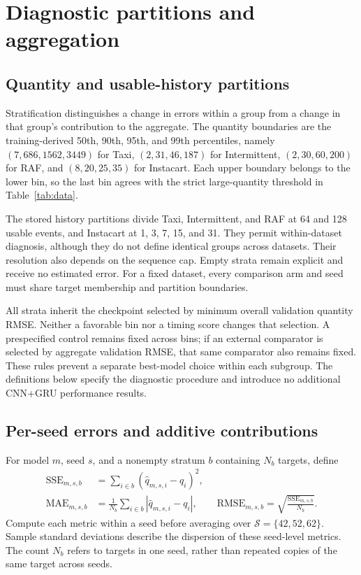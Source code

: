 \section{Diagnostic partitions and aggregation}
\label{app:strata}
\subsection{Quantity and usable-history partitions}
Stratification distinguishes a change in errors within a group from a change
in that group's contribution to the aggregate. The quantity boundaries are
the training-derived 50th, 90th, 95th, and 99th percentiles, namely
$(7,686,1562,3449)$ for Taxi, $(2,31,46,187)$ for Intermittent,
$(2,30,60,200)$ for RAF, and $(8,20,25,35)$ for Instacart.
Each upper boundary belongs to the lower bin, so the last bin agrees with
the strict large-quantity threshold in Table~\ref{tab:data}.

The stored history partitions divide Taxi, Intermittent, and RAF at 64 and
128 usable events, and Instacart at 1, 3, 7, 15, and 31. They permit
within-dataset diagnosis, although they do not define identical groups
across datasets. Their resolution also depends on the sequence cap.
Empty strata remain explicit and receive no estimated error. For a fixed
dataset, every comparison arm and seed must share target membership and
partition boundaries.

All strata inherit the checkpoint selected by minimum overall validation
quantity RMSE. Neither a favorable bin nor a timing score changes that
selection. A prespecified control remains fixed across bins; if an external
comparator is selected by aggregate validation RMSE, that same comparator
also remains fixed. These rules prevent a separate best-model choice within
each subgroup. The definitions below specify the diagnostic procedure and
introduce no additional CNN+GRU performance results.

\subsection{Per-seed errors and additive contributions}
For model $m$, seed $s$, and a nonempty stratum $b$ containing $N_b$
targets, define
\begin{align}
 \mathrm{SSE}_{m,s,b}&=\sum_{i\in b}(\widehat q_{m,s,i}-q_i)^2,\\
 \mathrm{MAE}_{m,s,b}&=\frac{1}{N_b}\sum_{i\in b}
       |\widehat q_{m,s,i}-q_i|,\qquad
 \mathrm{RMSE}_{m,s,b}=\sqrt{\frac{\mathrm{SSE}_{m,s,b}}{N_b}}.
 \label{eq:stratum-errors}
\end{align}
Compute each metric within a seed before averaging over
$\mathcal S=\{42,52,62\}$. Sample standard deviations describe the dispersion
of these seed-level metrics. The count $N_b$ refers to targets in one seed,
rather than repeated copies of the same target across seeds.

